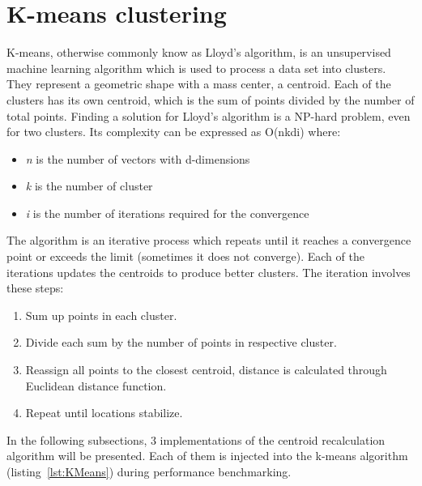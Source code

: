 \clearpage
\section{K-means clustering}
\label{sec: KMeansImp}
K-means, otherwise commonly know as Lloyd's algorithm, is an unsupervised machine learning algorithm which is used to process a data set into clusters.
They represent a geometric shape with a mass center, a centroid.
Each of the clusters has its own centroid, which is the sum of points divided by the number of total points. Finding a solution for Lloyd's algorithm is a NP-hard problem, even for two clusters. Its complexity can be expressed as O(nkdi) where:
\begin{itemize}
	\item \emph{n} is the number of vectors with d-dimensions
	\item \emph{k} is the number of cluster
	\item \emph{i} is the number of iterations required for the convergence
\end{itemize}

The algorithm is an iterative process which repeats until it reaches a convergence point or exceeds the limit (sometimes it does not converge).
Each of the iterations updates the centroids to produce better clusters.
The iteration involves these steps:
\begin{enumerate}
	\item Sum up points in each cluster.
	\item Divide each sum by the number of points in respective cluster.
	\item Reassign all points to the closest centroid, distance is calculated through Euclidean distance function.
	\item Repeat until locations stabilize.
\end{enumerate}

In the following subsections, 3 implementations of the centroid recalculation algorithm will be presented. Each of them is injected into the k-means algorithm (listing~\ref{lst:KMeans}) during performance benchmarking.

